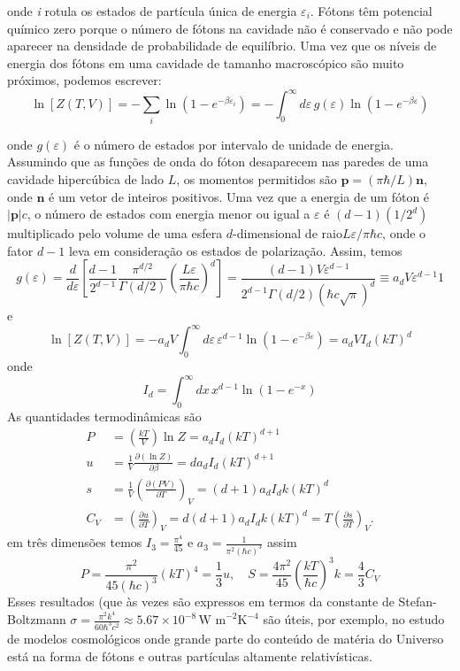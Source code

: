 \documentclass[12pt]{article}
\begin{document}
onde \textit{i} rotula os estados de partícula única de energia $\varepsilon_i$. Fótons têm potencial químico zero porque o número de fótons na cavidade não é conservado e não pode aparecer na densidade de probabilidade de equilíbrio. Uma vez que os níveis de energia dos fótons em uma cavidade de tamanho macroscópico são muito próximos, podemos escrever:
\[
\ln[Z(T, V)] = - \sum_i \ln (1 - e^{-\beta \varepsilon_i}) = - \int_0^\infty d\varepsilon \, g(\varepsilon) \ln (1 - e^{-\beta \varepsilon})
\]

onde $g(\varepsilon)$ é o número de estados por intervalo de unidade de energia. Assumindo que as funções de onda do fóton desaparecem nas paredes de uma cavidade hipercúbica de lado $L$, os momentos permitidos são $\boldsymbol{p} = (\pi \hbar/L)\boldsymbol{n}$, onde $\boldsymbol{n}$ é um vetor de inteiros positivos.
Uma vez que a energia de um fóton é $|\boldsymbol{p}|c$, o número de estados com energia menor ou igual a $\varepsilon$ é $(d-1)(1/2^d)$ multiplicado pelo volume de uma esfera $d$-dimensional de raio$ L \varepsilon/\pi \hbar c$, onde o fator $d-1$ leva em consideração os estados de polarização. Assim, temos
\[
g(\varepsilon) = \frac{d}{d\varepsilon} \left[ \frac{d-1}{2^{d-1}} \frac{\pi^{d/2}}{\Gamma(d/2)} \left( \frac{L \varepsilon}{\pi \hbar c} \right)^d \right] 
= \frac{(d-1) V \varepsilon^{d-1}}{2^{d-1} \Gamma(d/2) (\hbar c \sqrt{\pi})^d} \equiv a_d V \varepsilon^{d-1} 1
\]
e
\[
\ln[Z(T, V)] = -a_d V \int_0^\infty d\varepsilon \, \varepsilon^{d-1} \ln(1 - e^{-\beta \varepsilon}) = a_d V I_d (kT)^d
\]
onde
\[
I_d = \int_0^\infty dx \, x^{d-1} \ln(1 - e^{-x})
\]
As quantidades termodinâmicas são
\[
\begin{aligned}
P &= \left( \frac{kT}{V} \right) \ln Z = a_d I_d (kT)^{d+1} \\
u &= \frac{1}{V} \frac{\partial (\ln Z)}{\partial \beta} = d a_d I_d (kT)^{d+1} \\
s &= \frac{1}{V} \left( \frac{\partial (PV)}{\partial T} \right)_V = (d+1) a_d I_d k (kT)^d \\
C_V &= \left( \frac{\partial u}{\partial T} \right)_V = d(d+1) a_d I_d k (kT)^d = T \left( \frac{\partial s}{\partial T} \right)_V.
\end{aligned}
\]
 em três dimensões temos $I_3 = \frac{\pi^4}{45} \text{ e } a_3 = \frac{1}{\pi^2 (\hbar c)^3}$ assim
 \[
 P = \frac{\pi^2}{45 (\hbar c)^3} (kT)^4 = \frac{1}{3} u, \quad S = \frac{4 \pi^2}{45} \left( \frac{kT}{\hbar c} \right)^3 k = \frac{4}{3} C_V
 \]
 Esses resultados (que às vezes são expressos em termos da constante de Stefan-Boltzmann $\sigma = \frac{\pi^2 k^4}{60 \hbar^3 c^2} \approx 5.67 \times 10^{-8} \, \text{W m}^{-2} \text{K}^{-4}$ são úteis, por exemplo, no estudo de modelos cosmológicos onde grande parte do conteúdo de matéria do Universo está na forma de fótons e outras partículas altamente relativísticas. 
 
\end{document}
